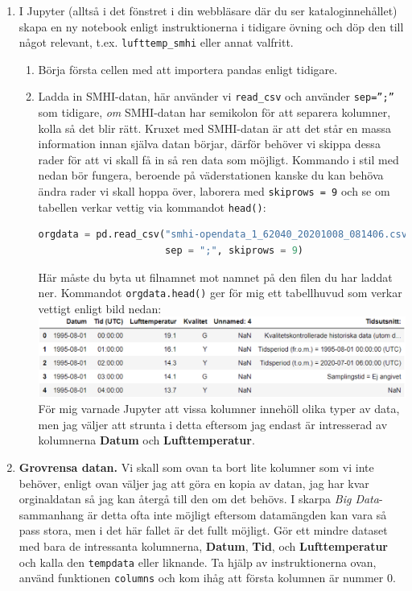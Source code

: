 \documentclass{article}
\begin{document}
\begin{enumerate}
\begin{enumerate}
    \end{enumerate}
    \item I Jupyter (alltså i det fönstret i din webbläsare där du ser kataloginnehållet) skapa en ny notebook enligt instruktionerna i tidigare övning och döp den till något relevant, t.ex. \verb+lufttemp_smhi+ eller annat valfritt.
    \begin{enumerate}
        \item Börja första cellen med att importera pandas enligt tidigare.
        \item Ladda in SMHI-datan, här använder vi \verb+read_csv+ och använder \verb+sep=”;”+ som tidigare, \emph{om} SMHI-datan har semikolon för att separera kolumner, kolla så det blir rätt. Kruxet med SMHI-datan är att det står en massa information innan själva datan börjar, därför behöver vi skippa dessa rader för att vi skall få in så ren data som möjligt. Kommando i stil med nedan bör fungera, beroende på väderstationen kanske du kan behöva ändra rader vi skall hoppa över, laborera med \verb+skiprows = 9+ och se om tabellen verkar vettig via kommandot \verb+head()+:
        \begin{lstlisting}[language=Python]
orgdata = pd.read_csv("smhi-opendata_1_62040_20201008_081406.csv",
                      sep = ";", skiprows = 9)
        \end{lstlisting}
        Här måste du byta ut filnamnet mot namnet på den filen du har laddat ner. Kommandot \verb+orgdata.head()+ ger för mig ett tabellhuvud som verkar vettigt enligt bild nedan:\\
\includegraphics[width=\textwidth]{figures/anaconda9.png}\\
    För mig varnade Jupyter att vissa kolumner innehöll olika typer av data, men jag väljer att strunta i detta eftersom jag endast är intresserad av kolumnerna \textbf{Datum} och \textbf{Lufttemperatur}.
\end{enumerate}
\item \textbf{Grovrensa datan.} Vi skall som ovan ta bort lite kolumner som vi inte behöver, enligt ovan väljer jag att göra en kopia av datan, jag har kvar orginaldatan så jag kan återgå till den om det behövs. I skarpa \emph{Big Data}-sammanhang är detta ofta inte möjligt eftersom datamängden kan vara så pass stora, men i det här fallet är det fullt möjligt. Gör ett mindre dataset med bara de intressanta kolumnerna, \textbf{Datum}, \textbf{Tid}, och \textbf{Lufttemperatur} och kalla den \verb+tempdata+ eller liknande. Ta hjälp av instruktionerna ovan, använd funktionen \verb+columns+ och kom ihåg att första kolumnen är nummer 0. 

\end{enumerate}
\end{document}
